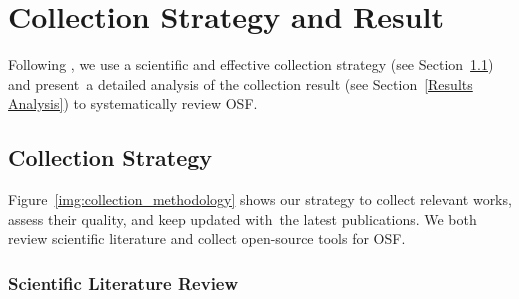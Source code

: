 
\section{Collection Strategy and Result}\label{Section2}


Following \cite{garousi2016systematic}, we use a scientific and effective collection strategy (see Section~\ref{Collection Methodology}) and present~a detailed analysis of the collection result (see Section~\ref{Results Analysis}) to systematically review OSF. 




\subsection{Collection Strategy}\label{Collection Methodology}

Figure~\ref{img:collection_methodology} shows our strategy to collect relevant works, assess their quality, and keep updated with~the latest publications. We both review scientific literature and collect open-source tools for OSF. 

\subsubsection{Scientific Literature Review}


